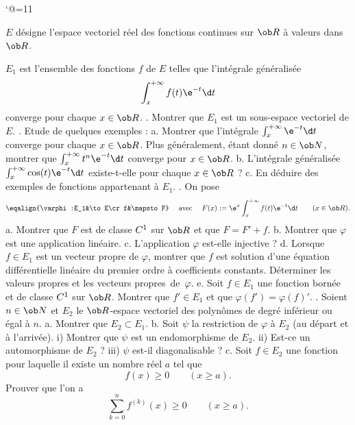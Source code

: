 \catcode`@=11\relax



\def\LD@Maths@Exercice@Display{\ignorespaces\LD@Exo@@Exo}%


\vglue-10mm%
\bigskip
\bigskip
\vfill
\noindent
$E$ d\'esigne l'espace vectoriel r\'eel des fonctions continues sur $\ob R$ \`a valeurs dans $\ob R$. 
\par\noindent
$E_1$ est l'ensemble des fonctions $f$ de $E$ telles que l'int\'egrale g\'en\'eralis\'ee
$$
\int_x^{+\infty}f(t)\e^{-t}\d t
$$
converge pour chaque $x\in\ob R$. 
\bigskip{}. Montrer que $E_1$ est un sous-espace vectoriel de $E$. 
\bigskip{}.  {Etude de quelques exemples : }
\smallskip\noindent
a. Montrer que l'int\'egrale $\int_x^{+\infty}\e^{-t}\d t$ converge pour chaque $x\in\ob R$. 
Plus g\'en\'eralement, \'etant donn\'e $n\in\ob N$, montrer que $\int_x^{+\infty}t^n\e^{-t}\d t$ converge pour $x\in\ob R$.
\medskip\noindent
b. L'int\'egrale g\'en\'eralis\'ee $\int_x^{+\infty}\cos(t)\e^{-t}\d t$ existe-t-elle pour chaque $x\in\ob R$ ?
\medskip\noindent
c. En d\'eduire des exemples de fonctions appartenant \`a $E_1$. 
\bigskip{}. On pose 
$$
\eqalign{\varphi:E_1&\to E\cr f&\mapsto F}\quad\mbox{ avec }\quad F(x):=\e^x\int_x^{+\infty}f(t)\e^{-t}\d t\qquad(x\in\ob R).
$$
a. Montrer que $F$ est de classe $\sc C^1$ sur $\ob R$ et que $F=F'+f$. 
\medskip\noindent
b. Montrer que $\varphi$ est une application lin\'eaire. 
\medskip\noindent
c. L'application $\varphi$ est-elle injective ?
\medskip\noindent
d. Lorsque $f\in E_1$ est un vecteur propre de $\varphi$, montrer que $f$ est solution d'une \'equation diff\'erentielle lin\'eaire du premier ordre \`a coefficients constants. 
D\'eterminer les valeurs propres et les vecteurs propres~de~$\varphi$. 
\medskip\noindent
e. Soit $f\in E_1$ une fonction born\'ee et de classe $\sc C^1$ sur $\ob R$. Montrer que $f'\in E_1$ et que $\varphi(f')=\varphi(f)'$. 
\bigskip{}. Soient $n\in\ob N$ et $E_2$  le $\ob R$-espace vectoriel des polyn\^omes de degr\'e inf\'erieur ou \'egal \`a $n$. 
\smallskip\noindent
a. Montrer que $E_2\subset E_1$. 
\medskip\noindent
b. Soit $\psi$ la restriction de $\varphi$ \`a $E_2$ (au d\'epart et \`a l'arriv\'ee).
\smallskip\noindent
i) Montrer que $\psi$ est un endomorphisme de $E_2$.\pn
ii) Est-ce un automorphisme de $E_2$ ? \pn
iii) $\psi$ est-il diagonalisable ?
\medskip\noindent
c. Soit $f\in E_2$ une fonction pour laquelle il existe un nombre r\'eel $a$ tel que 
$$
f(x)\ge 0\qquad(x\ge a).
$$
Prouver que l'on a 
$$
\sum_{k=0}^nf^{(k)}(x)\ge0\qquad(x\ge a).
$$
\vfill
\bye